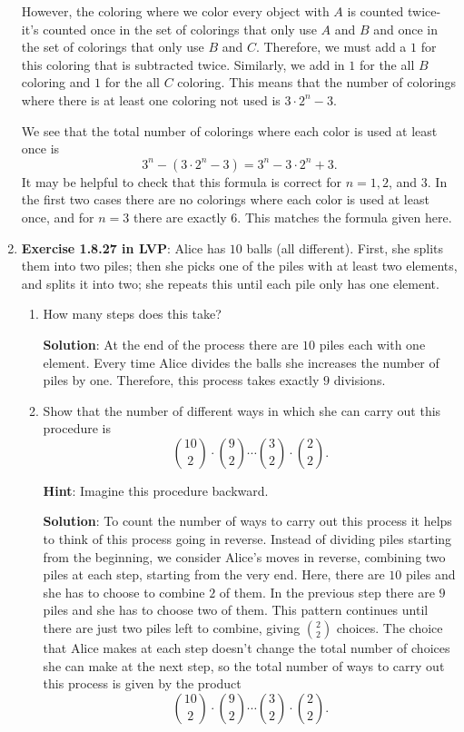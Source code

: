 \documentclass[11pt]{article}
\begin{document}
\begin{enumerate}
However, the coloring where we color every object with $A$ is counted twice- it's counted once in the set of colorings that only use $A$ and $B$ and once in the set of colorings that only use $B$ and $C$.  Therefore, we must add a $1$ for this coloring that is subtracted twice.  Similarly, we add in $1$ for the all $B$ coloring and $1$ for the all $C$ coloring.  This means that the number of colorings where there is at least one coloring not used is $3\cdot 2^n -3$.

We see that the total number of colorings where each color is used at least once is 
\[
3^n - (3\cdot  2^n -3) = 3^n - 3\cdot 2^n + 3.
\]  
It may be helpful to check that this formula is correct for $n=1,2$, and $3$.  In the first two cases there are no colorings where each color is used at least once, and for $n=3$ there are exactly $6$.  This matches the formula given here.


\item \textbf{Exercise 1.8.27 in LVP}:  Alice has $10$ balls (all different).  First, she splits them into two piles; then she picks one of the piles with at least two elements, and splits it into two; she repeats this until each pile only has one element.

\begin{enumerate}
\item How many steps does this take?

{\bf Solution}:  At the end of the process there are $10$ piles each with one element.  Every time Alice divides the balls she increases the number of piles by one.  Therefore, this process takes exactly $9$ divisions.


\item Show that the number of different ways in which she can carry out this procedure is 
\[ \binom{10}{2}\cdot \binom{9}{2} \cdots \binom{3}{2} \cdot \binom{2}{2}.\]

\textbf{Hint}: Imagine this procedure backward.

{\bf Solution}: To count the number of ways to carry out this process it helps to think of this process going in reverse.  Instead of dividing piles starting from the beginning, we consider Alice's moves in reverse, combining two piles at each step, starting from the very end.  Here, there are $10$ piles and she has to choose to combine $2$ of them.  In the previous step there are $9$ piles and she has to choose two of them.  This pattern continues until there are just two piles left to combine, giving $\binom{2}{2}$ choices.  The choice that Alice makes at each step doesn't change the total number of choices she can make at the next step, so the total number of ways to carry out this process is given by the product
\[ 
\binom{10}{2}\cdot \binom{9}{2} \cdots \binom{3}{2} \cdot \binom{2}{2}.
\]

\end{enumerate}



\end{enumerate}
\end{document}
